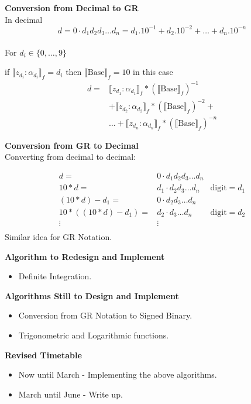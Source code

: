 \documentclass{csslides}\raggedright
\begin{document}
\begin{slide}{}

{\bf Conversion from Decimal to GR} \\
In decimal 
\[ d = 0 \cdot d_{1} d_{2} d_{3} \ldots d_{n}= d_{1}.10^{-1} + d_{2}.10^{-2} + 
\ldots + d_{n}.10^{-n} \]\\
For $d_{i} \in \{0, \ldots, 9\}$

if $ \llbracket z_{d_{i}}:\alpha_{d_{i}} \rrbracket_{f} = d_{i} $ then 
$\llbracket \mbox{Base} \rrbracket_{f} = 10$ in this case
\[ \begin{array}{lc}
d = & \llbracket z_{d_{1}}:\alpha_{d_{1}} \rrbracket_{f} * (\llbracket \mbox{Base} \rrbracket_{f})^{-1} \\
& + \llbracket z_{d_{2}}:\alpha_{d_{2}} \rrbracket_{f} * (\llbracket \mbox{Base} \rrbracket_{f})^{-2} + \\ 
 &  \ldots + \llbracket z_{d_{n}}:\alpha_{d_{n}} \rrbracket_{f} * (\llbracket \mbox{Base} \rrbracket_{f})^{-n} 
\end{array}\]


{\bf Conversion from GR to Decimal} \\
Converting from decimal to decimal:

\[ \begin{array}{rll}
d = & 0 \cdot d_{1} d_{2} d_{3} \ldots d_{n} & \\
10*d = & d_{1} \cdot d_{2} d_{3} \ldots d_{n} & \mbox{digit}=d_{1} \\
(10*d)-d_{1} = & 0 \cdot d_{2} d_{3} \ldots d_{n} & \\
10*((10*d)-d_{1}) = & d_{2} \cdot d_{3} \ldots d_{n} & \mbox{digit}=d_{2} \\
\vdots & \vdots & \\
\end{array}\]
Similar idea for GR Notation.
\end{slide}

\begin{slide}{}
{\bf Algorithm to Redesign and Implement}\\
\begin{itemize}
\item Definite Integration.
\end{itemize}
{\bf Algorithms Still to Design and Implement}
\begin{itemize}
\item Conversion from GR Notation to Signed Binary.
\item Trigonometric and Logarithmic functions.
\end{itemize}
{\bf Revised Timetable}
\begin{itemize}
\item Now until March - Implementing the above algorithms.
\item March until June - Write up.
\end{itemize}
\end{slide}
\end{document}

